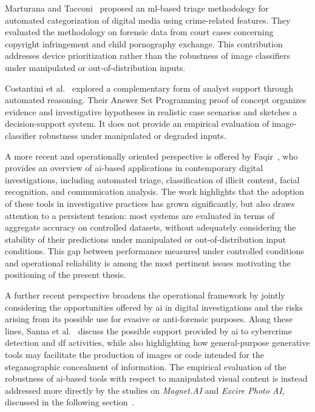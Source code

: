 Marturana and Tacconi~\cite{marturana2011digital} proposed an \gls{ml}-based
triage methodology for automated categorization of digital media using
crime-related features. They evaluated the methodology on forensic data from
court cases concerning copyright infringement and child pornography exchange.
This contribution addresses device prioritization rather than the robustness
of image classifiers under manipulated or out-of-distribution inputs.

Costantini et al.~\cite{costantini2019digital} explored a complementary form
of analyst support through automated reasoning. Their Answer Set Programming
proof of concept organizes evidence and investigative hypotheses in realistic
case scenarios and sketches a decision-support system. It does not provide an
empirical evaluation of image-classifier robustness under manipulated or
degraded inputs.

A more recent and operationally oriented perspective is offered by
Faqir~\cite{faqir2023digital}, who provides an overview of \gls{ai}-based
applications in contemporary digital investigations, including automated
triage, classification of illicit content, facial recognition, and
communication analysis. The work highlights that the adoption of these tools
in investigative practices has grown significantly, but also draws attention to
a persistent tension: most systems are evaluated in terms of aggregate accuracy
on controlled datasets, without adequately considering the stability of their
predictions under manipulated or out-of-distribution input conditions. This gap
between performance measured under controlled conditions and operational
reliability is among the most pertinent issues motivating the positioning of
the present thesis.

A further recent perspective broadens the operational framework by jointly
considering the opportunities offered by \gls{ai} in digital investigations
and the risks arising from its possible use for evasive or anti-forensic
purposes. Along these lines, Sanna et al.~\cite{sanna2025cybercrime} discuss
the possible support provided by \gls{ai} to cybercrime detection and \gls{df}
activities, while also highlighting how general-purpose generative tools may
facilitate the production of images or code intended for the steganographic
concealment of information. The empirical evaluation of the robustness of
\gls{ai}-based tools with respect to manipulated visual content is instead
addressed more directly by the studies on \textit{Magnet.AI} and
\textit{Excire Photo AI}, discussed in the following
section~\cite{sanna2024preliminary,sanna2025pixelperfect}.

